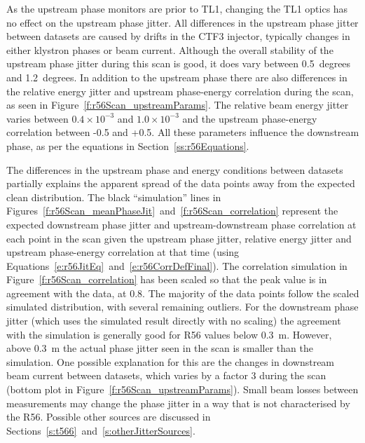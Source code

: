 As the upstream phase monitors are prior to TL1, changing the TL1 optics has no effect on the upstream phase jitter. All differences in the upstream phase jitter between datasets are caused by drifts in the CTF3 injector, typically changes in either klystron phases or beam current. Although the overall stability of the upstream phase jitter during this scan is good, it does vary between 0.5~degrees and 1.2~degrees. In addition to the upstream phase there are also differences in the relative energy jitter and upstream phase-energy correlation during the scan, as seen in Figure~\ref{f:r56Scan_upstreamParams}. The relative beam energy jitter varies between \(0.4\times10^{-3}\) and \(1.0\times10^{-3}\) and the upstream phase-energy correlation between -0.5 and +0.5. All these parameters influence the downstream phase, as per the equations in Section~\ref{ss:r56Equations}.

The differences in the upstream phase and energy conditions between datasets partially explains the apparent spread of the data points away from the expected clean distribution. The black ``simulation'' lines in Figures~\ref{f:r56Scan_meanPhaseJit}~and~\ref{f:r56Scan_correlation} represent the expected downstream phase jitter and upstream-downstream phase correlation at each point in the scan given the upstream phase jitter, relative energy jitter and upstream phase-energy correlation at that time (using Equations~\ref{e:r56JitEq}~and~\ref{e:r56CorrDefFinal}). The correlation simulation in Figure~\ref{f:r56Scan_correlation} has been scaled so that the peak value is in agreement with the data, at 0.8. The majority of the data points follow the scaled simulated distribution, with several remaining outliers. For the downstream phase jitter (which uses the simulated result directly with no scaling) the agreement with the simulation is generally good for R56 values below 0.3~m. However, above 0.3~m the actual phase jitter seen in the scan is smaller than the simulation. One possible explanation for this are the changes in downstream beam current between datasets, which varies by a factor 3 during the scan (bottom plot in Figure~\ref{f:r56Scan_upstreamParams}). Small beam losses between measurements may change the phase jitter in a way that is not characterised by the R56. Possible other sources are discussed in Sections~\ref{s:t566}~and~\ref{s:otherJitterSources}.

